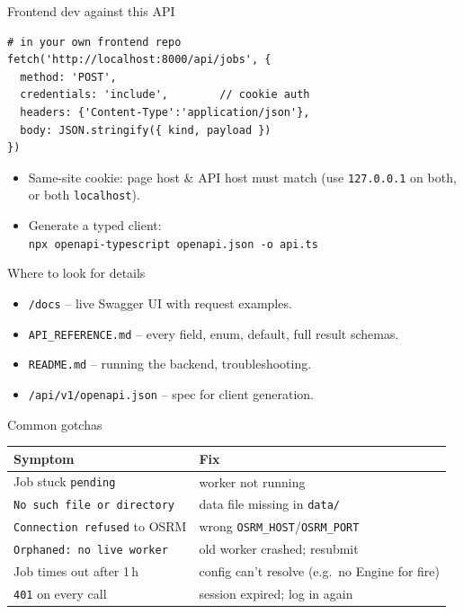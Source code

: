 \documentclass[aspectratio=169,11pt]{beamer}
\begin{document}
\begin{frame}[fragile]{Frontend dev against this API}
\begin{lstlisting}[language=shell]
# in your own frontend repo
fetch('http://localhost:8000/api/jobs', {
  method: 'POST',
  credentials: 'include',        // cookie auth
  headers: {'Content-Type':'application/json'},
  body: JSON.stringify({ kind, payload })
})
\end{lstlisting}
\vspace{6pt}
\begin{itemize}\setlength\itemsep{4pt}
  \item Same-site cookie: page host \& API host must match (use \texttt{127.0.0.1} on both, or both \texttt{localhost}).
  \item Generate a typed client:\\\texttt{npx openapi-typescript openapi.json -o api.ts}
\end{itemize}
\end{frame}

\begin{frame}{Where to look for details}
  \begin{itemize}\setlength\itemsep{8pt}
    \item \texttt{/docs} \;--\; live Swagger UI with request examples.
    \item \texttt{API\_REFERENCE.md} \;--\; every field, enum, default, full result schemas.
    \item \texttt{README.md} \;--\; running the backend, troubleshooting.
    \item \texttt{/api/v1/openapi.json} \;--\; spec for client generation.
  \end{itemize}
\end{frame}

\begin{frame}{Common gotchas}
\scriptsize
\begin{tabular}{p{} p{}}
\textbf{Symptom} & \textbf{Fix} \\\hline
Job stuck \texttt{pending} & worker not running \\
\texttt{No such file or directory} & data file missing in \texttt{data/} \\
\texttt{Connection refused} to OSRM & wrong \texttt{OSRM\_HOST}/\texttt{OSRM\_PORT} \\
\texttt{Orphaned: no live worker} & old worker crashed; resubmit \\
Job times out after 1\,h & config can't resolve (e.g.\ no Engine for fire) \\
\texttt{401} on every call & session expired; log in again \\
\end{tabular}
\end{frame}
\end{document}

